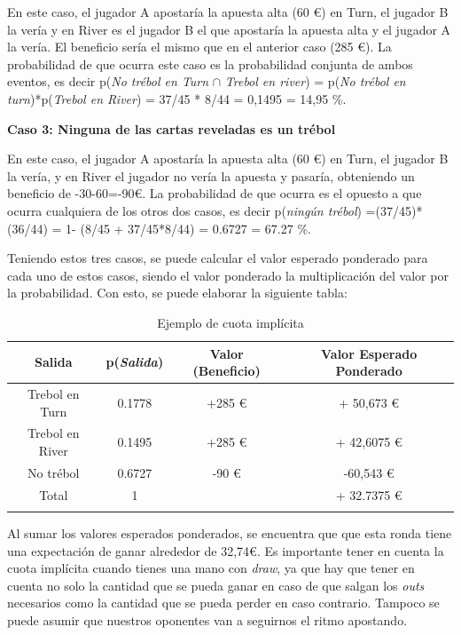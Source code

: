En este caso, el jugador A apostaría la apuesta alta (60 €) en Turn, el jugador B la vería y en River es el jugador B el que apostaría la apuesta alta y el jugador A la vería. El beneficio sería el mismo que en el anterior caso (285 €).
La probabilidad de que ocurra este caso es la probabilidad conjunta de ambos eventos, es decir
 p(\textit{No trébol en Turn} $\cap$ \textit{Trebol en river}) = p(\textit{No trébol en turn})*p(\textit{Trebol en River}) = 37/45 * 8/44 = 0,1495 = 14,95 \%.


\vspace{5mm} %
\textbf{Caso 3: Ninguna de las cartas reveladas es un trébol}
\vspace{5mm} %

En este caso, el jugador A apostaría la apuesta alta (60 €) en Turn, el jugador B la vería, y en River el jugador no vería la apuesta y pasaría, obteniendo un beneficio de -30-60=-90€.
La probabilidad de que ocurra es el opuesto a que ocurra cualquiera de los otros dos casos, es decir\cite{chen}
p(\textit{ningún trébol}) =(37/45)*(36/44) = 1- (8/45 + 37/45*8/44) = 0.6727 = 67.27 \%.

Teniendo estos tres casos, se puede calcular el valor esperado ponderado para cada uno de estos casos, siendo el valor ponderado la multiplicación del valor por la probabilidad. Con esto, se puede elaborar la siguiente tabla:
\begin{longtable}[c]{|c|c|c|c|}
\hline
\rowcolor{lightgray}Salida & p(\textit{Salida}) & Valor (Beneficio) & Valor Esperado Ponderado\\
\hline
Trebol en Turn & 0.1778&+285 €&+ 50,673 €\\
\hline
Trebol en River&0.1495&+285 €&+ 42,6075 €\\
\hline
No trébol&0.6727&-90 €&-60,543 €\\
\hline
Total & 1 & &+ 32.7375 €\\
\hline
\caption{Ejemplo de cuota implícita}
\label{tab:implied}
\end{longtable}

Al sumar los valores esperados ponderados, se encuentra que que esta ronda tiene una expectación de ganar alrededor de 32,74€. Es importante tener en cuenta la cuota implícita cuando tienes una mano con \textit{draw}, ya que hay que tener en cuenta no solo la cantidad que se pueda ganar en caso de que salgan los \textit{outs} necesarios como la cantidad que se pueda perder en caso contrario. Tampoco se puede asumir que nuestros oponentes van a seguirnos el ritmo apostando.\cite{chen}

